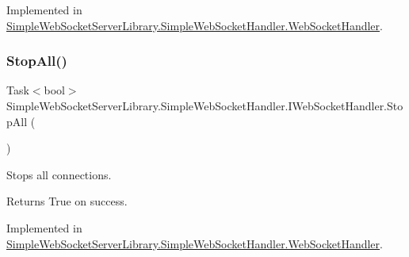 Implemented in \mbox{\hyperlink{class_simple_web_socket_server_library_1_1_simple_web_socket_handler_1_1_web_socket_handler_aab85fcebece3958e4308996b57415bd5}{Simple\+Web\+Socket\+Server\+Library.\+Simple\+Web\+Socket\+Handler.\+Web\+Socket\+Handler}}.

\mbox{\label{interface_simple_web_socket_server_library_1_1_simple_web_socket_handler_1_1_i_web_socket_handler_a9320e5c10e5afa670c1377b5c0e2f762}} 
\subsubsection{\texorpdfstring{Stop\+All()}{StopAll()}\hspace{0.1cm}{\footnotesize\ttfamily [1/2]}}
{\footnotesize\ttfamily Task$<$bool$>$ Simple\+Web\+Socket\+Server\+Library.\+Simple\+Web\+Socket\+Handler.\+I\+Web\+Socket\+Handler.\+Stop\+All (\begin{DoxyParamCaption}{ }\end{DoxyParamCaption})}



Stops all connections. 

\begin{DoxyReturn}{Returns}
True on success.
\end{DoxyReturn}


Implemented in \mbox{\hyperlink{class_simple_web_socket_server_library_1_1_simple_web_socket_handler_1_1_web_socket_handler_acd6bdfe5797bdacb39730f83bafde6fc}{Simple\+Web\+Socket\+Server\+Library.\+Simple\+Web\+Socket\+Handler.\+Web\+Socket\+Handler}}.

